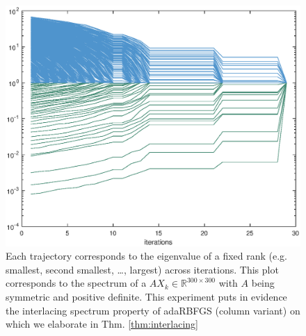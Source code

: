 \documentclass[12pt,conference,compsocconf]{IEEEtran}
\newcommand{\R}{\mathbb{R}}
\begin{document}
\begin{figure}
  \centering
  \includegraphics[height=0.75\columnwidth,width=1.0\columnwidth]{interlacing.eps}
  \vspace{-5mm}
  \caption{Each trajectory corresponds to the eigenvalue of a fixed rank (e.g. smallest, second smallest, \ldots, largest) across iterations. This plot corresponds to the spectrum of a $AX_k \in \R^{300\times300}$ with $A$ being symmetric and positive definite. This experiment puts in evidence the interlacing spectrum property of adaRBFGS (column variant) on which we elaborate in Thm. \ref{thm:interlacing} \label{fig:interlacing}}
\end{figure}
\end{document}
